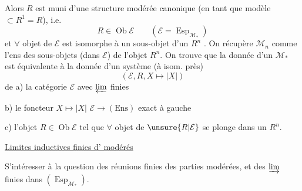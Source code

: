 Alors $R$ est muni d'une structure modérée canonique (en tant que modèle $\subset R^1=R$), i.e.
\[
 R\in\operatorname{Ob}\mathcal E\qquad(\mathcal E=\operatorname{Esp}_{\mathcal M_*})
\]
et $\forall$ objet de $\mathcal E$ est isomorphe à un sous-objet d'un $R^n$ . On récupère $\mathcal M_n$ comme l'ens des sous-objets  (dans $\mathcal E$) de l'objet $R^n$. On trouve que la donnée d'un $\mathcal M_*$ est équivalente à la donnée d'un système (à isom. près)
\[
 (\mathcal E,R,X\longmapsto |X|)
\]
de a) la catégorie $\mathcal E$ avec $\varprojlim$ finies

b) le foncteur $X\mapsto |X|$ $\mathcal E\longrightarrow(\mathrm{Ens})$ exact à gauche

c) l'objet $R\in\operatorname{Ob}\mathcal E$ tel que $\forall$ objet de $\unsure{R|\mathcal E}$ se plonge dans un $R^n$.



\uline{Limites inductives finies d' modérés}

S'intéresser à la question des réunions finies des parties modérées, et des $\varinjlim$ finies dans $(\operatorname{Esp}_{\mathcal M_*})$.


